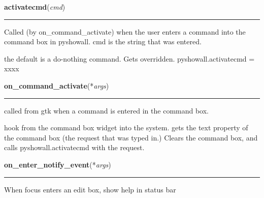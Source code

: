     \vspace{0.5ex}

    \begin{boxedminipage}{\textwidth}

    \raggedright \textbf{activatecmd}(\textit{cmd})

    \vspace{-1.5ex}

    \rule{\textwidth}{0.5\fboxrule}
    Called (by on\_command\_activate) when the user enters a command into 
    the command box in pyshowall. cmd is the string that was entered.

    the default is a do-nothing command. Gets overridden. 
    pyshowall.activatecmd = xxxx

    \vspace{1ex}

    \end{boxedminipage}

    \label{pyshowall:pyshowall:on_command_activate}

    \vspace{0.5ex}

    \begin{boxedminipage}{\textwidth}

    \raggedright \textbf{on\_command\_activate}(*\textit{args})

    \vspace{-1.5ex}

    \rule{\textwidth}{0.5\fboxrule}
    called from gtk when a command is entered in the command box.

    hook from the command box widget into the system. gets the text 
    property of the command box (the request that was typed in.) Clears the
    command box, and calls pyshowall.activatecmd with the request.

    \vspace{1ex}

    \end{boxedminipage}

    \label{pyshowall:pyshowall:on_enter_notify_event}

    \vspace{0.5ex}

    \begin{boxedminipage}{\textwidth}

    \raggedright \textbf{on\_enter\_notify\_event}(*\textit{args})

    \vspace{-1.5ex}

    \rule{\textwidth}{0.5\fboxrule}
    When focus enters an edit box, show help in status bar

    \vspace{1ex}

    \end{boxedminipage}

